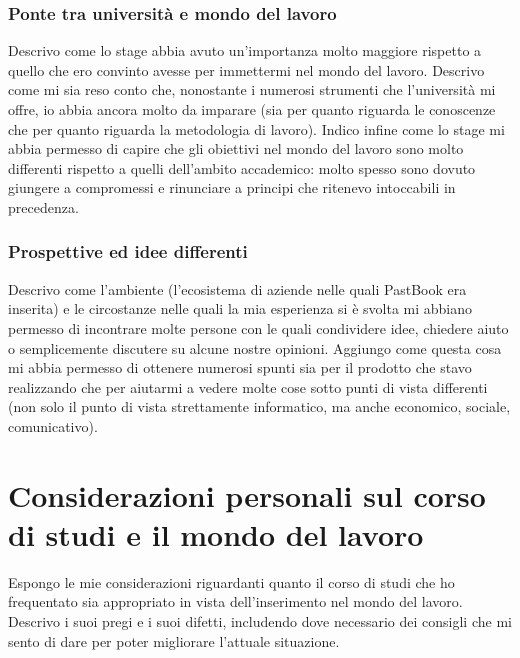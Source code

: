 			\subsubsection{Ponte tra università e mondo del lavoro}
				Descrivo come lo stage abbia avuto un'importanza molto maggiore rispetto a quello che ero convinto avesse per
				immettermi nel mondo del lavoro. Descrivo come mi sia reso conto che, nonostante i numerosi strumenti che
				l'università mi offre, io abbia ancora molto da imparare (sia per quanto riguarda le conoscenze che per quanto
				riguarda la metodologia di lavoro). Indico infine come lo stage mi abbia permesso di capire che gli obiettivi nel
				mondo del lavoro sono molto differenti rispetto a quelli dell'ambito accademico: molto spesso sono dovuto giungere
				a compromessi e rinunciare a principi che ritenevo intoccabili in precedenza.
			\subsubsection{Prospettive ed idee differenti}
				Descrivo come l'ambiente (l'ecosistema di aziende nelle quali PastBook era inserita) e le circostanze nelle quali la
				mia esperienza si è svolta mi abbiano permesso di incontrare molte persone con le quali condividere idee, chiedere
				aiuto o semplicemente discutere su alcune nostre opinioni. Aggiungo come questa cosa mi abbia permesso di ottenere
				numerosi spunti sia per il prodotto che stavo realizzando che per aiutarmi a vedere molte cose sotto punti di vista
				differenti (non solo il punto di vista strettamente informatico, ma anche economico, sociale, comunicativo).
	\section{Considerazioni personali sul corso di studi e il mondo del lavoro}
		Espongo le mie considerazioni riguardanti quanto il corso di studi che ho frequentato sia appropriato in vista dell'inserimento
		nel mondo del lavoro. Descrivo i suoi pregi e i suoi difetti, includendo dove necessario dei consigli che mi sento di dare per
		poter migliorare l'attuale situazione.
